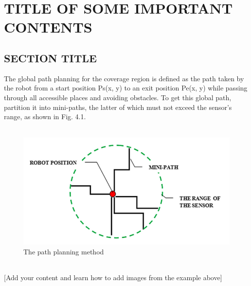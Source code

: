 \chapter{\centering \textbf{\MakeUppercase{Title of Some Important contents}}}
\section{\textbf{\MakeUppercase{Section Title}}}

The global path planning for the coverage region is defined as the path taken by the robot from a start position Ps(x, y) to an exit position Pe(x, y) while passing through all accessible places and avoiding obstacles. To get this global path, partition it into mini-paths, the latter of which must not exceed the sensor's range, as shown in Fig. 4.1.\\
\\\begin{figure}[htb]
\centering
\includegraphics[scale=0.5]{fig4.1.png} %
\caption{\texttt{}The path planning method\texttt{}}
\label{fig:label} %
\end{figure}\\

[Add your content and learn how to add images from the example  above]
